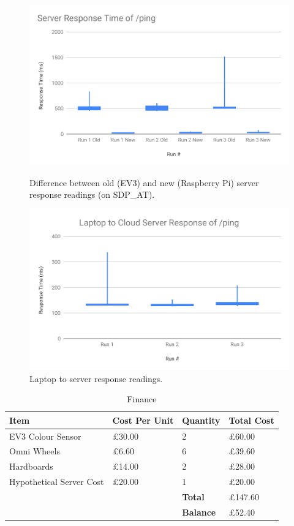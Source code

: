 \documentclass[a4paper]{article}
\begin{document}
\begin{center}
\begin{figure}[!htb]
  \includegraphics[width=\linewidth]{serv_resp.pdf}
  \caption{Difference between old (EV3) and new (Raspberry Pi) server response readings (on SDP\_AT).}\label{fig:awesome_image1}
\endminipage\hfill
     \includegraphics[width=\textwidth]{lap_serv.pdf}
     \caption{Laptop to server response readings.}\label{fig:awesome_image2}
\endminipage
\newline
\end{figure}

\begin{table}[!htb]
\centering
\begin{tabular}{| p{2cm} | p{2cm} | p{2cm} | p{2cm} |}
\hline
\textbf{Item} & \textbf{Cost Per Unit} & \textbf{Quantity} & \textbf{Total Cost} \\
\hline
EV3 Colour Sensor & £30.00 & 2 & £60.00 \\
\hline
Omni Wheels & £6.60 & 6 & £39.60 \\
\hline
Hardboards & £14.00 & 2 & £28.00 \\
\hline
Hypothetical Server Cost & £20.00 & 1 & £20.00 \\ 
\hline
 &  & \textbf{Total} & £147.60 \\ 
\hline
 &  & \textbf{Balance} & £52.40 \\
\hline
\end{tabular}
\caption{Finance}
\end{table}


\end{center}
\end{document}

